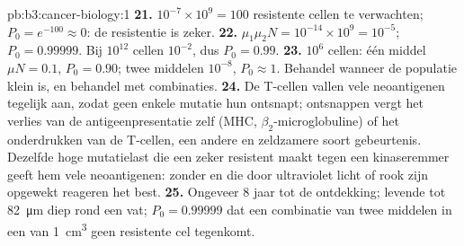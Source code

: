 \begin{solution}{pb:b3:cancer-biology:1}
\textbf{21.} $10^{-7}\times 10^{9} = 100$ resistente cellen te
verwachten; $P_{0} = e^{-100} \approx 0$: de resistentie is zeker.
\textbf{22.} $\mu_{1}\mu_{2}N = 10^{-14}\times 10^{9} = 10^{-5}$;
$P_{0} = 0.99999$. Bij $10^{12}$ cellen $10^{-2}$, dus $P_{0} = 0.99$.
\textbf{23.} $10^{6}$ cellen: één middel $\mu N = 0.1$, $P_{0} = 0.90$;
twee middelen $10^{-8}$, $P_{0} \approx 1$. Behandel wanneer de
populatie klein is, en behandel met combinaties.
\textbf{24.} De T-cellen vallen vele neoantigenen tegelijk aan, zodat
geen enkele mutatie hun ontsnapt; ontsnappen vergt het verlies van de
antigeenpresentatie zelf (MHC, $\beta_{2}$-microglobuline) of het
onderdrukken van de T-cellen, een andere en zeldzamere soort
gebeurtenis. Dezelfde hoge mutatielast die een  zeker resistent
maakt tegen een kinaseremmer geeft hem vele neoantigenen: 
zonder  en  die door ultraviolet licht of rook
zijn opgewekt reageren het best.
\textbf{25.} Ongeveer $8$ jaar tot de ontdekking; levende  tot
\qty{82}{\micro m} diep rond een vat; $P_{0} = 0.99999$ dat een
combinatie van twee middelen in een  van \qty{1}{cm^3} geen
resistente cel tegenkomt.
\end{solution}
